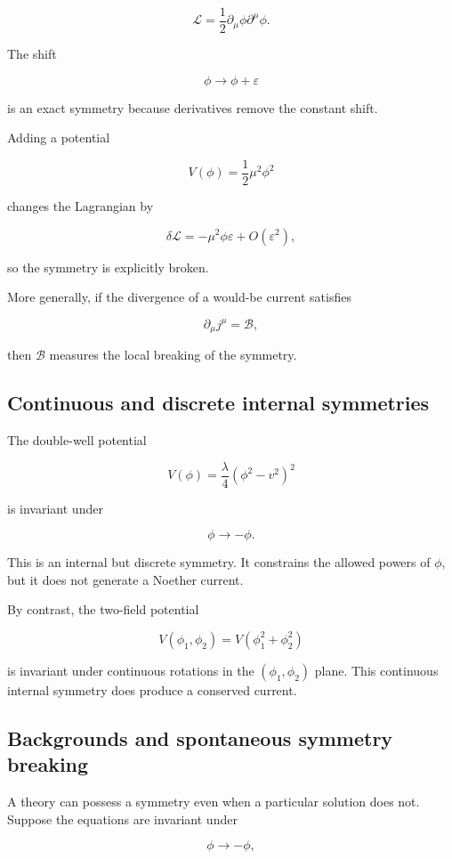 \[
\mathcal{L}
=
\frac{1}{2}
\partial_{\mu}\phi
\partial^{\mu}\phi.
\]

The shift

\[
\phi
\longrightarrow
\phi+\varepsilon
\]

is an exact symmetry because derivatives remove the constant shift.

Adding a potential

\[
V(\phi)
=
\frac{1}{2}\mu^{2}\phi^{2}
\]

changes the Lagrangian by

\[
\delta\mathcal{L}
=
-\mu^{2}\phi\varepsilon
+
O(\varepsilon^{2}),
\]

so the symmetry is explicitly broken.

More generally, if the divergence of a would-be current satisfies

\[
\partial_{\mu}j^{\mu}
=
\mathcal{B},
\]

then \(\mathcal{B}\) measures the local breaking of the symmetry.

\subsection{Continuous and discrete internal symmetries}

The double-well potential

\[
V(\phi)
=
\frac{\lambda}{4}
\left(
\phi^{2}-v^{2}
\right)^{2}
\]

is invariant under

\[
\phi
\longrightarrow
-\phi.
\]

This is an internal but discrete symmetry. It constrains the allowed powers of \(\phi\), but it does not generate a Noether current.

By contrast, the two-field potential

\[
V(\phi_1,\phi_2)
=
V
\left(
\phi_1^{2}+\phi_2^{2}
\right)
\]

is invariant under continuous rotations in the \((\phi_1,\phi_2)\) plane. This continuous internal symmetry does produce a conserved current.

\subsection{Backgrounds and spontaneous symmetry breaking}

A theory can possess a symmetry even when a particular solution does not. Suppose the equations are invariant under

\[
\phi
\longrightarrow
-\phi,
\]

